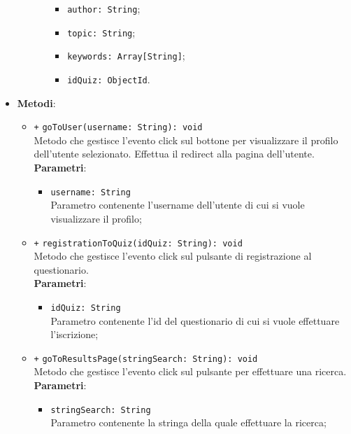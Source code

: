 \begin{itemize}
\begin{itemize}
\begin{itemize}
\begin{itemize}
					\item \texttt{author: String};
					\item \texttt{topic: String};
					\item \texttt{keywords: Array[String]};
					\item \texttt{idQuiz: ObjectId}.
				\end{itemize}
			\end{itemize}
		\end{itemize}
		\item \textbf{Metodi}: 
		\begin{itemize}
				\item \texttt{+} \texttt{goToUser(username: String): void} \\
				Metodo che gestisce l’evento click sul bottone per visualizzare il profilo dell'utente selezionato. Effettua il redirect alla pagina dell'utente.\\
				\textbf{Parametri}:
				\begin{itemize}
					\item \texttt{username: String} \\
					Parametro contenente l'username dell'utente di cui si vuole visualizzare il profilo;
				\end{itemize} 
				\item \texttt{+} \texttt{registrationToQuiz(idQuiz: String): void} \\
				Metodo che gestisce l’evento click sul pulsante di registrazione al questionario.\\
				\textbf{Parametri}:
				\begin{itemize}
					\item \texttt{idQuiz: String} \\
					Parametro contenente l'id del questionario di cui si vuole effettuare l'iscrizione;
				\end{itemize} 
				\item \texttt{+} \texttt{goToResultsPage(stringSearch: String): void} \\
				Metodo che gestisce l’evento click sul pulsante per effettuare una ricerca.\\
				\textbf{Parametri}:
				\begin{itemize}
					\item \texttt{stringSearch: String} \\
					Parametro contenente la stringa della quale effettuare la ricerca;
				\end{itemize} 
		\end{itemize}
	\end{itemize}

	